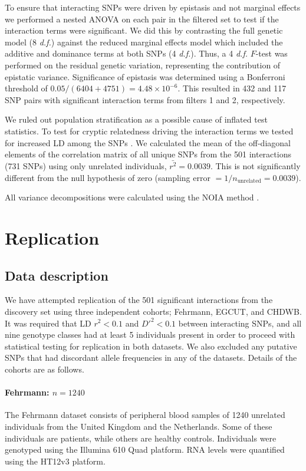 \documentclass{article}
\begin{document}
To ensure that interacting SNPs were driven by epistasis and not marginal effects we performed a nested ANOVA on each pair in the filtered set to test if the interaction terms were significant. We did this by contrasting the full genetic model (8 \emph{d.f.}) against the reduced marginal effects model which included the additive and dominance terms at both SNPs (4 \emph{d.f.}). Thus, a 4 \emph{d.f.} $F$-test was performed on the residual genetic variation, representing the contribution of epistatic variance. Significance of epistasis was determined using a Bonferroni threshold of $0.05 / (6404+4751) = 4.48 \times 10^{-6}$. This resulted in 432 and 117 SNP pairs with significant interaction terms from filters 1 and 2, respectively.

We ruled out population stratification as a possible cause of inflated test statistics. To test for cryptic relatedness driving the interaction terms we tested for increased LD among the SNPs \cite{Yang2011}. We calculated the mean of the off-diagonal elements of the correlation matrix of all unique SNPs from the 501 interactions (731 SNPs) using only unrelated individuals, $\bar{r^2} = 0.0039$. This is not significantly different from the null hypothesis of zero (sampling error $= 1/n_{\textrm{unrelated}} = 0.0039$).

All variance decompositions were calculated using the NOIA method \cite{Alvarez-Castro2008}.


\section{Replication}


\subsection{Data description}

We have attempted replication of the 501 significant interactions from the discovery set using three independent cohorts; Fehrmann, EGCUT, and CHDWB. It was required that LD $r^2 < 0.1$ and $D'^{2} < 0.1$ between interacting SNPs, and all nine genotype classes had at least 5 individuals present in order to proceed with statistical testing for replication in both datasets. We also excluded any putative SNPs that had discordant allele frequencies in any of the datasets. Details of the cohorts are as follows.

\paragraph{Fehrmann: $n=1240$}
The Fehrmann dataset \cite{Fehrmann2011} consists of peripheral blood samples of 1240 unrelated individuals from the United Kingdom and the Netherlands. Some of these individuals are patients, while others are healthy controls. Individuals were genotyped using the Illumina 610 Quad platform. RNA levels were quantified using the HT12v3 platform.
\end{document}
